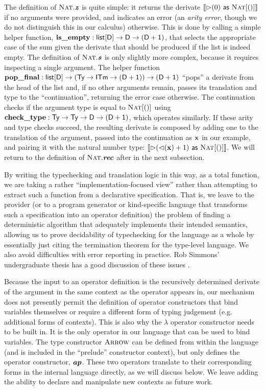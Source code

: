 \documentclass[9pt,preprint]{sigplanconf}
\begin{document}
The definition of $\textsc{Nat}.\textbf{\textit{z}}$ is quite simple: it returns the derivate $\llbracket \rhd(0)~{\sf as}~\textsc{Nat}[()] \rrbracket$ if no arguments were provided, and indicates an error (an \emph{arity error}, though we do not distinguish this in our calculus) otherwise. This is done by calling a simple helper function, ${\textbf{is\_empty}} : \textsf{list}[\textsf{D}]\rightarrow{\textsf{D}\rightarrow{(\textsf{D}+ \textsf{1})}}$, that selects the appropriate case of the sum given the derivate that should be produced if the list is indeed empty. The definition of $\textsc{Nat}.\textbf{\textit{s}}$ is only slightly more complex, because it requires inspecting a single argument. The helper function ${\textbf{pop\_final}} : \textsf{list}[\textsf{D}]\rightarrow{(\textsf{Ty}\rightarrow{\textsf{ITm}\rightarrow{(\textsf{D}+ \textsf{1})})}}\rightarrow{(\textsf{D}+ \textsf{1})}$ ``pops'' a derivate from the head of the list and, if no other arguments remain, passes its translation and type to the ``continuation'', returning the error case otherwise. The continuation checks if the argument type is equal to $\textsc{Nat}[()]$ using ${\textbf{check\_type}} : \textsf{Ty}\rightarrow{\textsf{Ty}\rightarrow{\textsf{D}\rightarrow{(\textsf{D}+ \textsf{1})}}}$, which operates similarly. If these arity and type checks succeed, the resulting derivate is composed by adding one to the translation of the argument, passed into the continuation as ${\textbf{x}}$ in our example, and pairing it with the natural number type: $\llbracket \rhd({\lhd}({\textbf{x}}) + 1)~{\sf as}~\textsc{Nat}[()] \rrbracket$. We will return to the definition of $\textsc{Nat}.\textbf{\textit{rec}}$ after in the next subsection.

By writing the typechecking and translation logic in this way, as a total function, we are taking a rather ``implementation-focused view'' rather than attempting to extract such a function from a declarative specification. That is,  we leave to the provider (or to a program generator or kind-specific language that transforms such a specification into an operator definition) the problem of finding a deterministic algorithm that adequately implements their intended semantics, allowing us to prove decidability of typechecking for the language as a whole by essentially just citing the termination theorem for the type-level language. We also avoid difficulties with error reporting in practice. Rob Simmons' undergraduate thesis has a good discussion of these issues \cite{rjs-princeton}.

Because the input to an operator definition is the recursively determined derivate of the argument in the same context as the operator appears in, our mechanism does not presently permit the definition of operator constructors that bind variables themselves or require a different form of typing judgement (e.g. additional forms of contexts). This is also why the $\lambda$ operator constructor needs to be built in. It is the only operator in our language that can be used to bind variables. The type constructor $\textsc{Arrow}$ can be defined from within the language (and is included in the ``prelude'' constructor context), but only defines the operator constructor, $\textbf{\textit{ap}}$. These two operators translate to their corresponding forms in the internal language directly, as we will discuss below. We leave adding the ability to declare and manipulate new contexts as future work.
\end{document}

